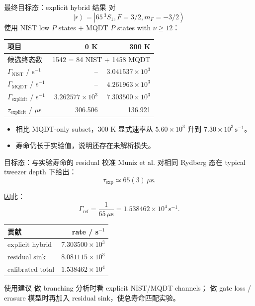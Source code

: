 \documentclass[aspectratio=169,11pt]{ctexbeamer}
\newcommand{\ket}[1]{\left|#1\right\rangle}
\begin{document}
\begin{frame}{最终目标态：explicit hybrid 结果}
  对
  \[
    \ket{r}=\ket{65\,{}^3S_1,F=3/2,m_F=-3/2}
  \]
  使用 NIST low \(P\) states + MQDT \(P\) states with \(\nu\ge12\)：

  \begin{table}
    \centering
    \begin{tabular}{lrr}
      \toprule
      项目 & 0 K & 300 K \\
      \midrule
      候选终态数 & \multicolumn{2}{c}{1542 = 84 NIST + 1458 MQDT} \\
      \(\Gamma_{\mathrm{NIST}}\) / s\(^{-1}\) & -- & \(3.041537\times10^3\) \\
      \(\Gamma_{\mathrm{MQDT}}\) / s\(^{-1}\) & -- & \(4.261963\times10^3\) \\
      \(\Gamma_{\mathrm{explicit}}\) / s\(^{-1}\) & \(3.262577\times10^3\) & \(7.303500\times10^3\) \\
      \(\tau_{\mathrm{explicit}}\) / \(\mu\)s & 306.506 & 136.921 \\
      \bottomrule
    \end{tabular}
  \end{table}

  \begin{itemize}
    \item 相比 MQDT-only subset，300 K 显式速率从 \(5.60\times10^3\) 升到 \(7.30\times10^3\,\mathrm{s}^{-1}\)。
    \item 寿命仍长于实验值，说明还存在未解析损失。
  \end{itemize}
\end{frame}

\begin{frame}{目标态：与实验寿命的 residual 校准}
  Muniz et al. 对相同 Rydberg 态在 typical tweezer depth 下给出：
  \[
    \tau_{\mathrm{exp}}\simeq65(3)\,\mu\mathrm{s}.
  \]

  因此：
  \[
    \Gamma_{\mathrm{ref}}
    =
    \frac{1}{65\,\mu\mathrm{s}}
    =
    1.538462\times10^4\,\mathrm{s}^{-1}.
  \]

  \begin{table}
    \centering
    \begin{tabular}{lr}
      \toprule
      贡献 & rate / s\(^{-1}\) \\
      \midrule
      explicit hybrid & \(7.303500\times10^3\) \\
      residual sink & \(8.081115\times10^3\) \\
      calibrated total & \(1.538462\times10^4\) \\
      \bottomrule
    \end{tabular}
  \end{table}

  \begin{block}{使用建议}
    做 branching 分析时看 explicit NIST/MQDT channels；
    做 gate loss / erasure 模型时再加入 residual sink，使总寿命匹配实验。
  \end{block}
\end{frame}
\end{document}
